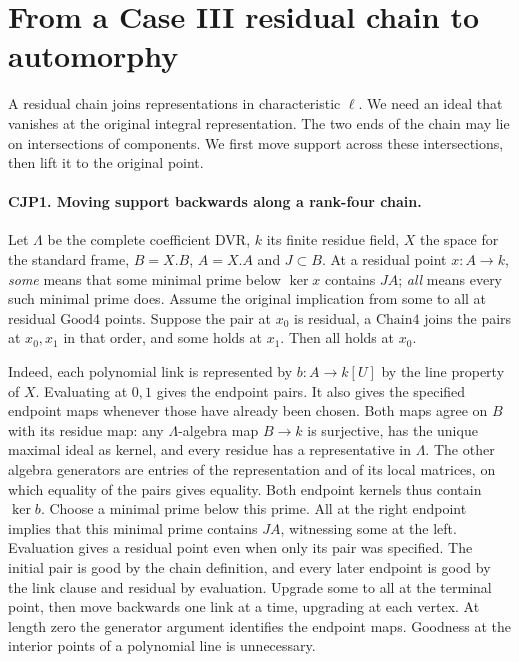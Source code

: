 \section{From a Case III residual chain to automorphy}

A residual chain joins representations in characteristic $\ell$. We need
an ideal that vanishes at the original integral representation. The two
ends of the chain may lie on intersections of components. We first move
support across these intersections, then lift it to the original point.

\paragraph{CJP1. Moving support backwards along a rank-four chain.}
Let $\Lambda$ be the complete coefficient DVR, $k$ its finite residue
field, $X$ the space for the standard frame, $B=X.B$, $A=X.A$ and
$J\subset B$. At a residual point $x:A\to k$, \emph{some} means that
some minimal prime below $\ker x$ contains $JA$; \emph{all} means
every such minimal prime does. Assume the original implication from
some to all at residual $\mathrm{Good4}$ points. Suppose the pair at
$x_0$ is residual, a $\mathrm{Chain4}$ joins the pairs at $x_0,x_1$
in that order, and some holds at $x_1$. Then all holds at $x_0$.

Indeed, each polynomial link is represented by $b:A\to k[U]$ by the
line property of $X$. Evaluating at $0,1$ gives the endpoint pairs.
It also gives the specified endpoint maps whenever those have already
been chosen. Both maps agree on $B$ with its residue map: any
$\Lambda$-algebra map $B\to k$ is surjective, has the unique maximal
ideal as kernel, and every residue has a representative in $\Lambda$.
The other algebra generators are entries of the representation and of
its local matrices, on which equality of the pairs gives equality.
Both endpoint kernels thus contain $\ker b$. Choose a minimal prime
below this prime. All at the right endpoint implies that this minimal
prime contains $JA$, witnessing some at the left. Evaluation gives a
residual point even when only its pair was specified. The initial pair
is good by the chain definition, and every later endpoint is good by
the link clause and residual by evaluation. Upgrade some to all at the
terminal point, then move backwards one link at a time, upgrading at each
vertex. At length zero the generator argument identifies the endpoint
maps. Goodness at the interior points of a polynomial line is unnecessary.

